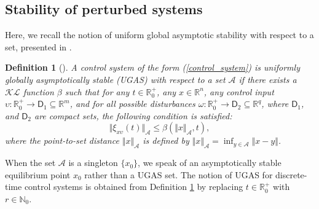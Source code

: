 \documentclass{amsart}
\newtheorem{definition}[theorem]{Definition}
\numberwithin{equation}{section}
\newcommand{\R}{{\mathbb{R}}}
\newcommand{\N}{{\mathbb{N}}}
\def\set#1{{ \{ #1 \}}}
\begin{document}
\subsection{Stability of perturbed systems}

Here, we recall the notion of uniform global asymptotic stability with respect to a set, 
presented in \cite{lin}. 

\begin{definition}[\cite{lin}]
\label{UGAS}
A control system of the form (\ref{control_system}) is uniformly globally asymptotically stable (UGAS) 
with respect to a set $\mathcal{A}$ if there exists a $\mathcal{KL}$ 
function $\beta$ such that for any $t\in\R_0^+$, any $x\in\R^n$, any control input $\upsilon:\R_0^+\rightarrow\mathsf{D}_1\subseteq\R^m$, and for all possible disturbances $\omega:\R_0^+\rightarrow\mathsf{D}_2\subseteq\R^q$, where $\mathsf{D}_1$, and $\mathsf{D}_2$ are compact sets, the following condition is satisfied:
\begin{equation}\label{GAS}
\Vert\xi_{x\upsilon}(t)\Vert_\mathcal{A}\leq\beta(\Vert{x}\Vert_\mathcal{A},t),
\end{equation} 
where the {\em point-to-set distance} $\Vert{x}\Vert_{\mathcal{A}}$ is defined by \mbox{$\Vert{x}\Vert_\mathcal{A}=\inf_{y\in\mathcal{A}}\Vert{x}-y\Vert$}. 
\end{definition}

When the set $\mathcal{A}$ is a singleton $\set{x_0}$, we speak of an asymptotically stable equilibrium
point $x_0$ rather than a UGAS set. The notion of UGAS for discrete-time control systems is obtained from Definition \ref{UGAS} by replacing $t\in\R_0^+$ with $r\in\N_0$.
\end{document}
